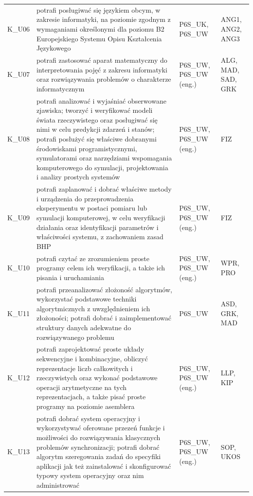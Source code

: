 \documentclass[12pt,a4paper]{article}
\begin{document}
{\begin{longtable}{m{1cm}m{8.8cm}m{2.1cm}m{2.5cm}}
\rowcolor{tableRowAlt} K\_U06 & potrafi posługiwać się językiem obcym, w zakresie informatyki, na poziomie zgodnym z wymaganiami określonymi dla poziomu B2 Europejskiego Systemu Opisu Kształcenia Językowego & {\scriptsize P6S\_UK, P6S\_UW} & {\scriptsize ANG1, ANG2, ANG3} \\
\rowcolor{tableRowLight} K\_U07 & potrafi zastosować aparat matematyczny do interpretowania pojęć z zakresu informatyki oraz rozwiązywania problemów o charakterze informatycznym & {\scriptsize P6S\_UW, P6S\_UW {\scriptsize (eng.)}} & {\scriptsize ALG, MAD, SAD, GRK} \\
\rowcolor{tableRowAlt} K\_U08 & potrafi analizować i wyjaśniać obserwowane zjawiska; tworzyć i weryfikować modeli świata rzeczywistego oraz posługiwać się nimi w celu predykcji zdarzeń i stanów; potrafi posłużyć się właściwe dobranymi środowiskami programistycznymi, symulatorami oraz narzędziami wspomagania komputerowego do symulacji, projektowania i analizy prostych systemów & {\scriptsize P6S\_UW, P6S\_UW {\scriptsize (eng.)}} & {\scriptsize FIZ} \\
\rowcolor{tableRowLight} K\_U09 & potrafi zaplanować i dobrać właściwe metody i urządzenia do przeprowadzenia eksperymentu w postaci pomiaru lub symulacji komputerowej, w celu weryfikacji działania oraz identyfikacji parametrów i właściwości systemu, z zachowaniem zasad BHP & {\scriptsize P6S\_UW, P6S\_UW {\scriptsize (eng.)}} & {\scriptsize FIZ} \\
\rowcolor{tableRowAlt} K\_U10 & potrafi czytać ze zrozumieniem proste programy celem ich weryfikacji, a także ich pisania i uruchamiania & {\scriptsize P6S\_UW, P6S\_UW {\scriptsize (eng.)}} & {\scriptsize WPR, PRO} \\
\rowcolor{tableRowLight} K\_U11 & potrafi przeanalizować złożoność algorytmów, wykorzystać podstawowe techniki algorytmicznych z uwzględnieniem ich złożoności; potrafi dobrać i zaimplementować struktury danych adekwatne do rozwiązywanego problemu & {\scriptsize P6S\_UW} & {\scriptsize ASD, GRK, MAD} \\
\rowcolor{tableRowAlt} K\_U12 & potrafi zaprojektować proste układy sekwencyjne i kombinacyjne, obliczyć reprezentacje liczb całkowitych i rzeczywistych oraz wykonać podstawowe operacji arytmetyczne na tych reprezentacjach, a także pisać proste programy na poziomie asemblera & {\scriptsize P6S\_UW, P6S\_UW {\scriptsize (eng.)}} & {\scriptsize LLP, KIP} \\
\rowcolor{tableRowLight} K\_U13 & potrafi dobrać system operacyjny i wykorzystywać oferowane przezeń funkcje i możliwości do rozwiązywania klasycznych problemów synchronizacji; potrafi dobrać algorytm szeregowania zadań do specyfiki aplikacji jak też zainstalować i skonfigurować typowy system operacyjny oraz nim administrować & {\scriptsize P6S\_UW, P6S\_UW {\scriptsize (eng.)}} & {\scriptsize SOP, UKOS} \\

\end{longtable}}
\end{document}
